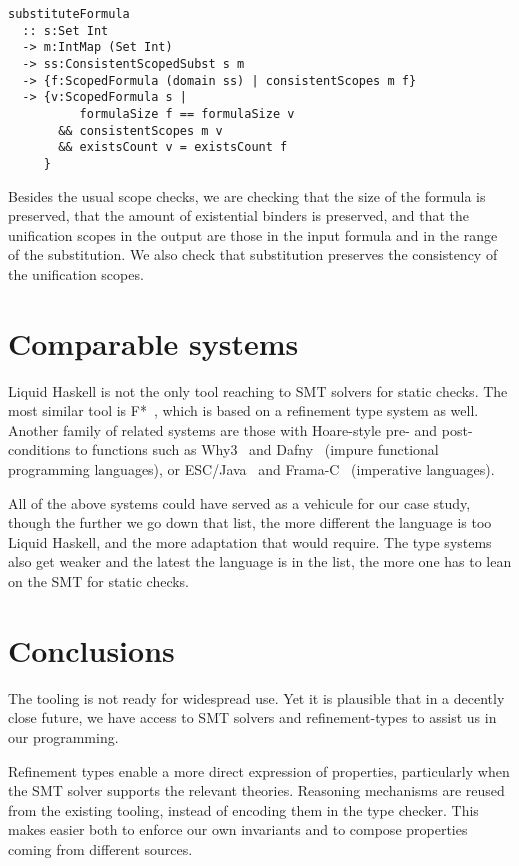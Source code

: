 \documentclass[sigconf, review]{acmart}
\begin{document}
\begin{verbatim}
substituteFormula
  :: s:Set Int
  -> m:IntMap (Set Int)
  -> ss:ConsistentScopedSubst s m
  -> {f:ScopedFormula (domain ss) | consistentScopes m f}
  -> {v:ScopedFormula s |
          formulaSize f == formulaSize v
       && consistentScopes m v
       && existsCount v = existsCount f
     }
\end{verbatim}
Besides the usual scope checks, we are checking that the size of the formula
is preserved, that the amount of existential binders is preserved, and that
the unification scopes in the output are those in the input formula and in
the range of the substitution. We also check that substitution preserves
the consistency of the unification scopes.

\section{Comparable systems}

Liquid Haskell is not the only tool reaching to SMT solvers for static checks.
The most similar tool is F*~\cite{swamy16}, which is based on a refinement type
system as well. Another family of related systems are those with Hoare-style
pre- and post-conditions to functions such as Why3~\cite{filli13} and
Dafny~\cite{leino17} (impure functional programming languages), or
ESC/Java~\cite{flanagan02} and Frama-C~\cite{kosmatov24} (imperative languages).

All of the above systems could have served as a vehicule for our case study,
though the further we go down that list, the more different the language is too
Liquid Haskell, and the more adaptation that would require. The type systems
also get weaker and the latest the language is in the list, the more one has to
lean on the SMT for static checks.

\section{Conclusions}
\label{conclusions}

The tooling is not ready for widespread use. Yet it is plausible that in a decently
close future, we have access to SMT solvers and refinement-types to assist us in
our programming.

Refinement types enable a more direct expression of properties,
particularly when the SMT solver supports the relevant theories. Reasoning
mechanisms are reused from the existing tooling, instead of encoding them
in the type checker. This makes easier both to enforce our own invariants and to
compose properties coming from different sources.
\end{document}
